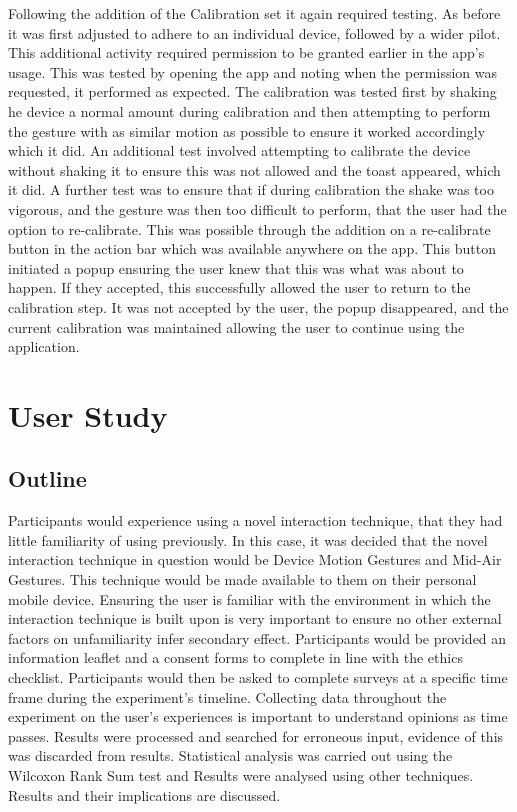 \documentclass{l4proj}
\begin{document}
Following the addition of the Calibration set it again required testing. As before it was first adjusted to adhere to an individual device, followed by a wider pilot. This additional activity required permission to be granted earlier in the app’s usage. This was tested by opening the app and noting when the permission was requested, it performed as expected. The calibration was tested first by shaking he device a normal amount during calibration and then attempting to perform the gesture with as similar motion as possible to ensure it worked accordingly which it did. An additional test involved attempting to calibrate the device without shaking it to ensure this was not allowed and the toast appeared, which it did. A further test was to ensure that if during calibration the shake was too vigorous, and the gesture was then too difficult to perform, that the user had the option to re-calibrate. This was possible through the addition on a re-calibrate button in the action bar which was available anywhere on the app. This button initiated a popup ensuring the user knew that this was what was about to happen. If they accepted, this successfully allowed the user to return to the calibration step. It was not accepted by the user, the popup disappeared, and the current calibration was maintained allowing the user to continue using the application.

\chapter{User Study}

\section{Outline}
Participants would experience using a novel interaction technique, that they had little familiarity of using previously. In this case, it was decided that the novel interaction technique in question would be Device Motion Gestures and Mid-Air Gestures. This technique would be made available to them on their personal mobile device. Ensuring the user is familiar with the environment in which the interaction technique is built upon is very important to ensure no other external factors on unfamiliarity infer secondary effect. Participants would be provided an information leaflet and a consent forms to complete in line with the ethics checklist. Participants would then be asked to complete surveys at a specific time frame during the experiment’s timeline. Collecting data throughout the experiment on the user’s experiences is important to understand opinions as time passes. Results were processed and searched for erroneous input, evidence of this was discarded from results. Statistical analysis was carried out using the Wilcoxon Rank Sum test and Results were analysed using other techniques. Results and their implications are discussed.
\end{document}
